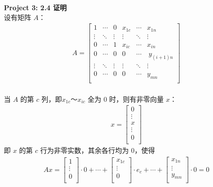 \documentclass[UTF8,nofonts]{ctexart}
\begin{document}
\textbf{Project 3: 2.4 证明} \\

设有矩阵 $A$：
\begin{gather*}
A=
\begin{bmatrix} 
    1 & \cdots & 0 & x_{1c} & \cdots & x_{1n}  \\ 
    \vdots & \ddots & \vdots & \vdots & \ddots & \vdots \\
    0 & \cdots & 1 & x_{ic} & \cdots & x_{in} \\
    0 & \cdots & 0 & 0 & \cdots & \ y_{(i+1)n}\\
    \vdots & \ddots & \vdots & \vdots & \ddots & \vdots \\
    0 & \cdots & 0 & 0 & \cdots & y_{mn}\\
\end{bmatrix}
\end{gather*} \\
当 $A$ 的第 $c$ 列，即$x_{1c}$～$x_{ic}$ 全为 0 时，则有非零向量 $x$：
\begin{gather*}
x=
\begin{bmatrix} 
    0  \\ 
    \vdots \\
    x \\
    \vdots \\
    0 \\
\end{bmatrix}
\end{gather*}
即 $x$ 的第 $c$ 行为非零实数，其余各行均为 0，使得
\begin{gather*}
Ax=
\begin{bmatrix} 
    1 \\ 
    \vdots  \\
    0 \\
\end{bmatrix}
\cdot 0 + \cdots +
\begin{bmatrix} 
    x_{1c} \\ 
    \vdots  \\
    0 \\
\end{bmatrix}
\cdot e_{c} + \cdots + 
\begin{bmatrix} 
x_{1n} \\ 
\vdots  \\
y_{mn} \\
\end{bmatrix} 
\cdot 0 = 0 \\
\end{gather*} 
\end{document}
